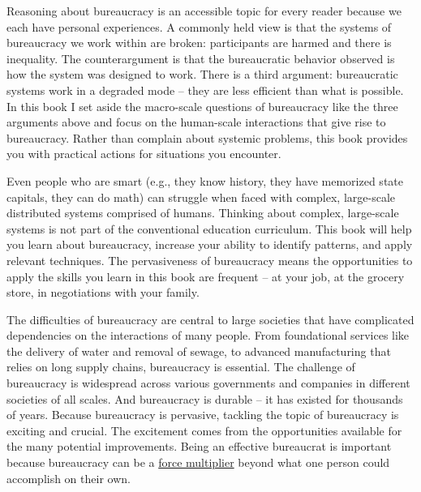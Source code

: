 Reasoning about bureaucracy is an accessible topic for every reader because we each have personal experiences.
A commonly held view is that the systems of bureaucracy we work within are broken: participants are harmed and there is inequality. 
The counterargument is that the bureaucratic behavior observed is how the system was designed to work. There is a third argument: bureaucratic systems work in a degraded mode -- they are less efficient than what is possible. 
In this book I set aside the macro-scale questions of bureaucracy like the three arguments above and focus on the human-scale interactions that give rise to bureaucracy. Rather than complain about systemic problems, this book provides you with practical actions for situations you encounter.

Even people who are smart (e.g., they know history, they have memorized state capitals, they can do math) can struggle when faced with complex, large-scale distributed systems comprised of humans. Thinking about complex, large-scale systems is not part of the conventional education curriculum. This book will help you learn about bureaucracy, increase your ability to identify patterns, and apply relevant techniques. The pervasiveness of bureaucracy means the opportunities to apply the skills you learn in this book are frequent -- at your job, at the grocery store, in negotiations with your family.


The difficulties of bureaucracy are central to large societies that have complicated dependencies on the interactions of many people. From foundational services like the delivery of water and removal of sewage, to advanced manufacturing that relies on long supply chains, bureaucracy is essential.  The challenge of bureaucracy is widespread across various governments and companies in different societies of all scales. And bureaucracy is durable -- it has existed for thousands of years. Because bureaucracy is pervasive, tackling the topic of bureaucracy is exciting and crucial. The excitement comes from the opportunities available for the many potential improvements.
Being an effective bureaucrat is important because bureaucracy can be a \href{https://en.wikipedia.org/wiki/Force_multiplication}{force multiplier}\iftoggle{WPinmargin}{\marginpar{[Wikipedia] Force\\multiplication}}{}
beyond what one person could accomplish on their own.

